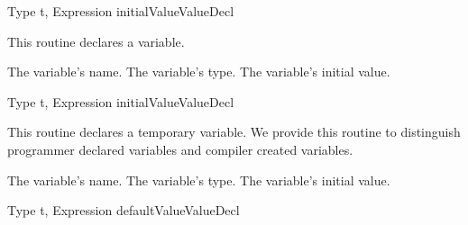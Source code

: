 	{Type t, Expression initialValue}{ValueDecl}
\begin{functionality}
This routine declares a variable.
\begin{Parameters}
 The variable's name.
 The variable's type.
 The variable's initial value.
\end{Parameters}
\end{functionality}
	{Type t, Expression initialValue}{ValueDecl}
\begin{functionality}
This routine declares a temporary variable.  We provide this
routine to distinguish programmer declared variables and compiler
created variables.
\begin{Parameters}
 The variable's name.
 The variable's type.
 The variable's initial value.
\end{Parameters}
\end{functionality}
	{Type t, Expression defaultValue}{ValueDecl}
